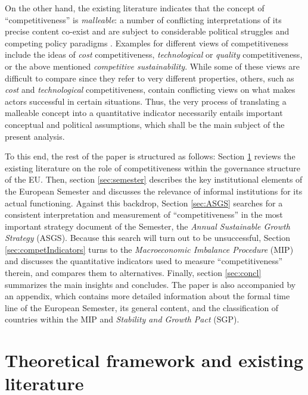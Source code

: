\documentclass[
]{article}
\begin{document}
On the other hand, the existing literature indicates that the concept of
\enquote{competitiveness} is \emph{malleable}: a number of conflicting interpretations of
its precise content co-exist and are subject to considerable political struggles
and competing policy paradigms \citep[e.g.][]{Borras2011, Princen2016}.
Examples for different views of competitiveness include the ideas of
\emph{cost} competitiveness, \emph{technological} or \emph{quality} competitiveness, or the
above mentioned \emph{competitive sustainability}.
While some of these views are difficult to compare since they refer to very
different properties, others, such as \emph{cost} and \emph{technological} competitiveness,
contain conflicting views on what makes actors successful in certain situations.
Thus, the very process of translating a malleable concept into a quantitative
indicator necessarily entails important conceptual and political assumptions,
which shall be the main subject of the present analysis.

To this end, the rest of the paper is structured as follows: Section \ref{sec:litreview}
reviews the existing literature on the role of competitiveness
within the governance structure of the EU. Then, section \ref{sec:semester}
describes the key institutional elements of the European Semester and
discusses the relevance of informal institutions for its actual functioning.
Against this backdrop, Section
\ref{sec:ASGS} searches for a consistent interpretation and measurement of
\enquote{competitiveness} in the most important strategy document of the Semester, the
\emph{Annual Sustainable Growth Strategy} (ASGS).
Because this search will turn out to be unsuccessful, Section
\ref{sec:competIndicators} turns to the \emph{Macroeconomic Imbalance Procedure} (MIP)
and discusses the quantitative
indicators used to measure \enquote{competitiveness} therein,
and compares them to alternatives.
Finally, section \ref{sec:concl} summarizes the main insights and concludes.
The paper is also accompanied by an appendix, which contains more detailed
information about the formal time line of the European Semester, its general
content, and the classification of countries within the MIP and
\emph{Stability and Growth Pact} (SGP).

\hypertarget{sec:litreview}{%
\section{Theoretical framework and existing literature}\label{sec:litreview}}
\end{document}

